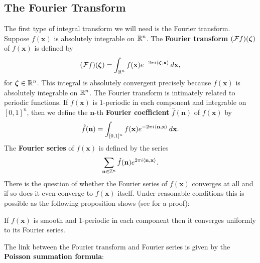     \subsection*{The Fourier Transform}
      The first type of integral transform we will need is the Fourier transform. Suppose $f(\mathbf{x})$ is absolutely integrable on $\mathbb{R}^{n}$. The \textbf{Fourier transform} $(\mathcal{F}f)(\boldsymbol{\zeta})$ of $f(\mathbf{x})$ is defined by
      \[
        (\mathcal{F}f)(\boldsymbol{\zeta}) = \int_{\mathbb{R}^{n}}f(\mathbf{x})e^{-2\pi i\langle\boldsymbol{\zeta},\mathbf{x}\rangle}\,d\mathbf{x},
      \]
      for $\boldsymbol{\zeta} \in \mathbb{R}^{n}$. This integral is absolutely convergent precisely because $f(\mathbf{x})$ is absolutely integrable on $\mathbb{R}^{n}$. The Fourier transform is intimately related to periodic functions. If $f(\mathbf{x})$ is $1$-periodic in each component and integrable on $[0,1]^{n}$, then we define the $\mathbf{n}$-th \textbf{Fourier coefficient} $\hat{f}(\mathbf{n})$ of $f(\mathbf{x})$ by
      \[
        \hat{f}(\mathbf{n}) = \int_{[0,1]^{n}}f(\mathbf{x})e^{-2\pi i\langle\mathbf{n},\mathbf{x}\rangle}\,d\mathbf{x}.
      \]
      The \textbf{Fourier series} of $f(\mathbf{x})$ is defined by the series
      \[
        \sum_{\mathbf{n} \in \mathbb{Z}^{n}}\hat{f}(\mathbf{n})e^{2\pi i\langle\mathbf{n},\mathbf{x}\rangle}.
      \]
      There is the question of whether the Fourier series of $f(\mathbf{x})$ converges at all and if so does it even converge to $f(\mathbf{x})$ itself. Under reasonable conditions this is possible as the following proposition shows (see \cite{grafakos2008classical} for a proof):

      \begin{proposition}
        If $f(\mathbf{x})$ is smooth and $1$-periodic in each component then it converges uniformly to its Fourier series.
      \end{proposition}

      The link between the Fourier transform and Fourier series is given by the \textbf{Poisson summation formula}:

